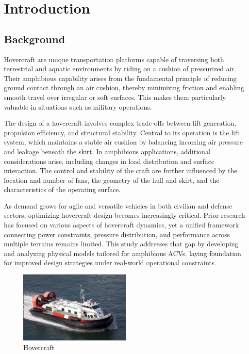 \maketitle

\section{Introduction}

\subsection{Background}

Hovercraft are unique transportation platforms capable of traversing both terrestrial and aquatic environments by riding on a cushion of pressurized air. Their amphibious capability arises from the fundamental principle of reducing ground contact through an air cushion, thereby minimizing friction and enabling smooth travel over irregular or soft surfaces. This makes them particularly valuable in situations such as military operations.

The design of a hovercraft involves complex trade-offs between lift generation, propulsion efficiency, and structural stability. Central to its operation is the lift system, which maintains a stable air cushion by balancing incoming air pressure and leakage beneath the skirt. In amphibious applications, additional considerations arise, including changes in load distribution and surface interaction. The control and stability of the craft are further influenced by the location and number of fans, the geometry of the hull and skirt, and the characteristics of the operating surface.

As demand grows for agile and versatile vehicles in both civilian and defense sectors, optimizing hovercraft design becomes increasingly critical. Prior research has focused on various aspects of hovercraft dynamics, yet a unified framework connecting power constraints, pressure distribution, and performance across multiple terrains remains limited. This study addresses that gap by developing and analyzing physical models tailored for amphibious ACVs, laying foundation for improved design strategies under real-world operational constraints.

\begin{figure}[H]
  \centering
  \includegraphics[width=0.5\textwidth]{images/Hovercraft.png}
  \caption{Hovercraft\cite{hovercraftImage}}
  \label{fig:Hovercraft}
\end{figure}

